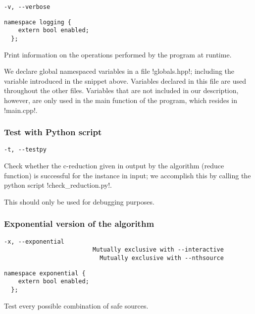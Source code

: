 \begin{lstlisting}[aboveskip=\smallskipamount]
  -v, --verbose
\end{lstlisting}

\begin{lstlisting}[style=c++_block, aboveskip=\smallskipamount]
  namespace logging {
    extern bool enabled;
  };
\end{lstlisting}

Print information on the operations performed by the program at runtime.

We declare global namespaced variables in a file !globals.hpp!; including the variable introduced in the snippet above.
Variables declared in this file are used throughout the other files.
Variables that are not included in our description, however, are only used in the main function of the program, which resides in !main.cpp!.

\subsubsection*{Test with Python script}

\begin{lstlisting}[aboveskip=\smallskipamount]
  -t, --testpy
\end{lstlisting}

Check whether the c-reduction given in output by the algorithm (reduce function) is successful for the instance in input; we accomplish this by calling the python script !check_reduction.py!.

This should only be used for debugging purposes.

\subsubsection*{Exponential version of the algorithm}

\begin{lstlisting}[aboveskip=\smallskipamount]
  -x, --exponential
                         Mutually exclusive with --interactive
                           Mutually exclusive with --nthsource
\end{lstlisting}

\begin{lstlisting}[style=c++_block, aboveskip=\smallskipamount]
  namespace exponential {
    extern bool enabled;
  };
\end{lstlisting}

Test every possible combination of safe sources.


